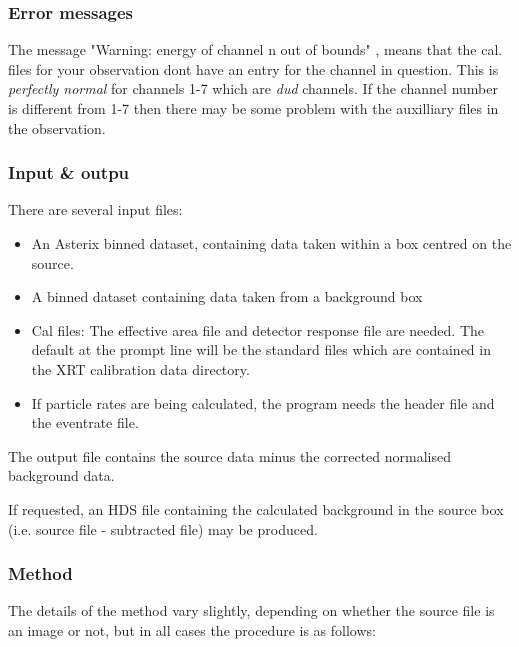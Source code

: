 \documentclass{book}
\renewcommand{\_}{{\tt\char'137}}     %
\begin{document}
\subsubsection{Error messages}
The message "Warning: energy of channel n out of bounds" ,
means that the cal. files for your observation dont have an entry
for the channel in question. This is {\em perfectly normal} for channels
1-7 which are {\em dud} channels. If the channel number is different
from 1-7 then there may be some problem with the auxilliary files
in the observation.

\subsubsection{Input \& outpu}
There are several input files:
\begin{itemize}
\item An Asterix binned dataset, containing data taken within a box
centred on the source.
\item A binned dataset containing data taken from a background box
\item Cal files: The effective area file and detector response file
are needed. The default at the prompt line will be the standard
files which are contained in the XRT calibration data directory.
\item If particle rates are being calculated, the program needs the header
file and the eventrate file.
\end{itemize}
The output file contains the source data minus the corrected
normalised background data.

If requested, an HDS file containing the calculated background in the
source box (i.e. source file - subtracted file) may be produced.

\subsubsection{Method}
The details of the method vary slightly, depending on whether the
source file is an image or not, but in all cases the procedure
is as follows:
\end{document}
